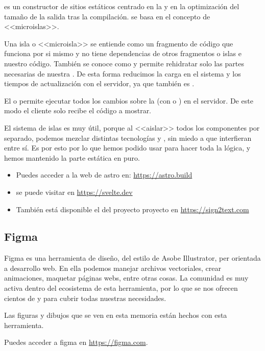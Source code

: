  es un constructor de sitios estáticos centrado en la  y en la optimización del tamaño de la salida tras la compilación.  se basa en el concepto de <<microislas>>.

Una isla o <<microisla>> se entiende como un fragmento de código que funciona por si mismo y no tiene dependencias de otros fragmentos o islas e nuestro código. También se conoce como  y permite rehidratar solo las partes necesarias de nuestra . De esta forma reducimos la carga en el sistema y los tiempos de actualización con el servidor, ya que también es .

El  o  permite ejecutar todos los cambios sobre la  (con  o ) en el servidor. De este modo el cliente solo recibe el código  a mostrar.

El sistema de islas es muy útil, porque al <<aislar>> todos los componentes por separado, podemos mezclar distintas tecnologías y , sin miedo a que interfieran entre sí. Es por esto por lo que hemos podido usar  para hacer toda la lógica, y hemos mantenido la parte estática en  puro.

\begin{itemize}
  \item Puedes acceder a la web de astro en: \url{https://astro.build}
  \item {} se puede visitar en \url{https://svelte.dev}
  \item También está disponible el  del proyecto proyecto en \url{https://sign2text.com}
\end{itemize}

\subsection{Figma}

Figma es una herramienta de diseño, del estilo de Asobe Illustrator, per orientada a desarrollo web. En ella podemos manejar archivos vectoriales, crear animaciones, maquetar páginas webs, entre otras cosas. La comunidad es muy activa dentro del ecosistema de esta herramienta, por lo que se nos ofrecen cientos de  y  para cubrir todas nuestras necesidades.

Las figuras y dibujos que se ven en esta memoria están hechos con esta herramienta.

Puedes acceder a figma en \url{https://figma.com}.

